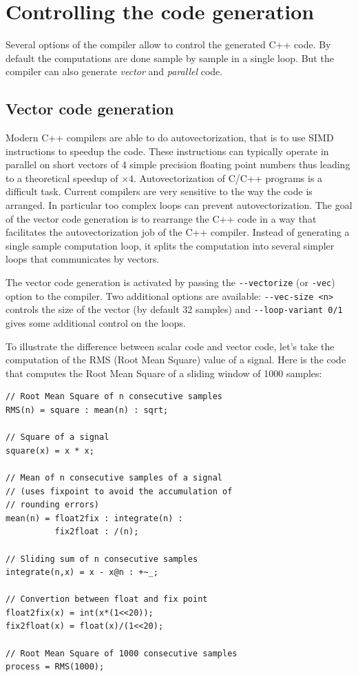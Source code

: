 \chapter{Controlling the code generation}
\label{Code-generation}

Several options of the \faust compiler allow to control the generated C++ code. By default the computations are done sample by sample in a single loop. But the compiler can also generate \textit{vector} and \textit{parallel} code.

\section{Vector code generation}
Modern C++ compilers are able to do autovectorization, that is to use SIMD instructions to speedup the code. These instructions can typically operate in parallel on short vectors of 4 simple precision floating point numbers thus leading to a theoretical speedup of $\times4$. 
Autovectorization of C/C++ programs is a difficult task. Current compilers are very sensitive to the way the code is arranged. In particular too complex loops can prevent autovectorization. The goal of the vector code generation is to rearrange the C++ code in a way that facilitates the autovectorization job of the C++ compiler. Instead of generating a single sample computation loop, it splits the computation into several simpler loops that communicates by vectors.

The vector code generation is activated by passing the \lstinline!--vectorize! (or \lstinline!-vec!) option to the \faust compiler. Two additional options are available:  \lstinline!--vec-size <n>! controls the size of the vector (by default 32 samples) and \lstinline!--loop-variant 0/1! gives some additional control on the loops.  

To illustrate the difference between scalar code and vector code, let's take the computation of the RMS (Root Mean Square) value of a signal.  Here is the \faust code that computes the Root Mean Square of a sliding window of 1000 samples:
\label{rms}
\begin{lstlisting}
// Root Mean Square of n consecutive samples
RMS(n) = square : mean(n) : sqrt;

// Square of a signal
square(x) = x * x;

// Mean of n consecutive samples of a signal
// (uses fixpoint to avoid the accumulation of
// rounding errors) 
mean(n) = float2fix : integrate(n) : 
          fix2float : /(n); 

// Sliding sum of n consecutive samples
integrate(n,x) = x - x@n : +~_;

// Convertion between float and fix point
float2fix(x) = int(x*(1<<20));      
fix2float(x) = float(x)/(1<<20);    

// Root Mean Square of 1000 consecutive samples
process = RMS(1000);
\end{lstlisting}

